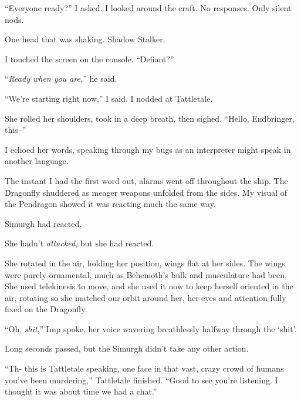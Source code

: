 ``Everyone ready?'' I asked.  I looked around the craft.  No responses.  Only silent nods.



One head that was shaking.  Shadow Stalker.



I touched the screen on the console.  ``Defiant?''



``\emph{Ready when you are,}'' he said.



``We're starting right now,'' I said.  I nodded at Tattletale.



She rolled her shoulders, took in a deep breath, then sighed.  ``Hello, Endbringer, this--''



I echoed her words, speaking through my bugs as an interpreter might speak in another language.



The instant I had the first word out, alarms went off throughout the ship.  The Dragonfly shuddered as meager weapons unfolded from the sides.  My visual of the Pendragon showed it was reacting much the same way.



Simurgh had reacted.



She hadn't \emph{attacked}, but she had reacted.



She rotated in the air, holding her position, wings flat at her sides.  The wings were purely ornamental, much as Behemoth's bulk and musculature had been.  She used telekinesis to move, and she used it now to keep herself oriented in the air, rotating so she matched our orbit around her, her eyes and attention fully fixed on the Dragonfly.



``Oh, \emph{shit},'' Imp spoke, her voice wavering breathlessly halfway through the `shit'.



Long seconds passed, but the Simurgh didn't take any other action.



``Th- this is Tattletale speaking, one face in that vast, crazy crowd of humans you've been murdering,'' Tattletale finished.  ``Good to see you're listening.  I thought it was about time we had a chat.''



